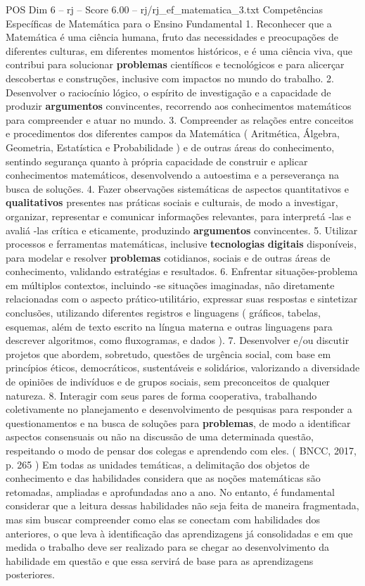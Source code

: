 \begin{textsample}{POS Dim 6 – rj – Score 6.00 – rj/rj\_ef\_matematica\_3.txt}
Competências Específicas de Matemática para o Ensino Fundamental 1.
Reconhecer que a Matemática é uma ciência humana, fruto das necessidades e preocupações de diferentes culturas, em diferentes momentos históricos, e é uma ciência viva, que contribui para solucionar \textbf{problemas} científicos e tecnológicos e para alicerçar descobertas e construções, inclusive com impactos no mundo do trabalho. 2.
Desenvolver o raciocínio lógico, o espírito de investigação e a capacidade de produzir \textbf{argumentos} convincentes, recorrendo aos conhecimentos matemáticos para compreender e atuar no mundo. 3.
Compreender as relações entre conceitos e procedimentos dos diferentes campos da Matemática ( Aritmética, Álgebra, Geometria, Estatística e Probabilidade ) e de outras áreas do conhecimento, sentindo segurança quanto à própria capacidade de construir e aplicar conhecimentos matemáticos, desenvolvendo a autoestima e a perseverança na busca de soluções. 4.
Fazer observações sistemáticas de aspectos quantitativos e \textbf{qualitativos} presentes nas práticas sociais e culturais, de modo a investigar, organizar, representar e comunicar informações relevantes, para interpretá -las e avaliá -las crítica e eticamente, produzindo \textbf{argumentos} convincentes. 5.
Utilizar processos e ferramentas matemáticas, inclusive \textbf{tecnologias} \textbf{digitais} disponíveis, para modelar e resolver \textbf{problemas} cotidianos, sociais e de outras áreas de conhecimento, validando estratégias e resultados. 6.
Enfrentar situações-problema em múltiplos contextos, incluindo -se situações imaginadas, não diretamente relacionadas com o aspecto prático-utilitário, expressar suas respostas e sintetizar conclusões, utilizando diferentes registros e linguagens ( gráficos, tabelas, esquemas, além de texto escrito na língua materna e outras linguagens para descrever algoritmos, como fluxogramas, e dados ). 7.
Desenvolver e/ou discutir projetos que abordem, sobretudo, questões de urgência social, com base em princípios éticos, democráticos, sustentáveis e solidários, valorizando a diversidade de opiniões de indivíduos e de grupos sociais, sem preconceitos de qualquer natureza. 8.
Interagir com seus pares de forma cooperativa, trabalhando coletivamente no planejamento e desenvolvimento de pesquisas para responder a questionamentos e na busca de soluções para \textbf{problemas}, de modo a identificar aspectos consensuais ou não na discussão de uma determinada questão, respeitando o modo de pensar dos colegas e aprendendo com eles. ( BNCC, 2017, p. 265 ) Em todas as unidades temáticas, a delimitação dos objetos de conhecimento e das habilidades considera que as noções matemáticas são retomadas, ampliadas e aprofundadas ano a ano.
No entanto, é fundamental considerar que a leitura dessas habilidades não seja feita de maneira fragmentada, mas sim buscar compreender como elas se conectam com habilidades dos anteriores, o que leva à identificação das aprendizagens já consolidadas e em que medida o trabalho deve ser realizado para se chegar ao desenvolvimento da habilidade em questão e que essa servirá de base para as aprendizagens posteriores.

\end{textsample}

